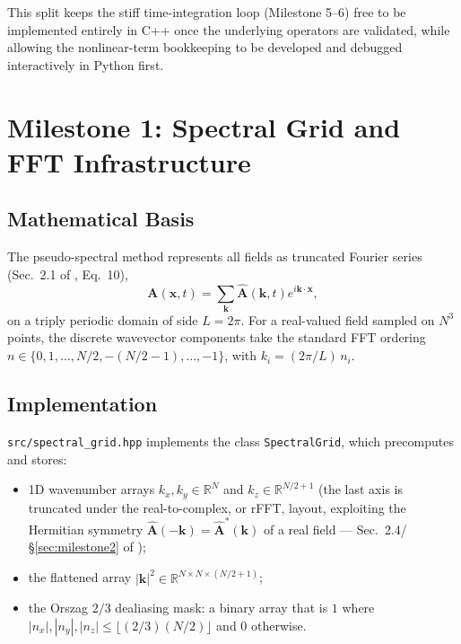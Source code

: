 \documentclass[11pt, a4paper]{article}
\begin{document}
This split keeps the stiff time-integration loop (Milestone 5--6) free to
be implemented entirely in C++ once the underlying operators are validated,
while allowing the nonlinear-term bookkeeping to be developed and debugged
interactively in Python first.

\section{Milestone 1: Spectral Grid and FFT Infrastructure}
\label{sec:milestone1}

\subsection{Mathematical Basis}

The pseudo-spectral method represents all fields as truncated Fourier
series (Sec.~2.1 of \citealp{foundation2026}, Eq.~10),
\begin{equation}
    \mathbf{A}(\mathbf{x}, t) = \sum_{\mathbf{k}} \hat{\mathbf{A}}(\mathbf{k}, t)
    e^{i \mathbf{k} \cdot \mathbf{x}},
\end{equation}
on a triply periodic domain of side $L = 2\pi$. For a real-valued field
sampled on $N^3$ points, the discrete wavevector components take the
standard FFT ordering $n \in \{0, 1, \dots, N/2, -(N/2-1), \dots, -1\}$,
with $k_i = (2\pi/L)\, n_i$.

\subsection{Implementation}

\texttt{src/spectral\_grid.hpp} implements the class \texttt{SpectralGrid},
which precomputes and stores:
\begin{itemize}
    \item 1D wavenumber arrays $k_x, k_y \in \mathbb{R}^N$ and
    $k_z \in \mathbb{R}^{N/2+1}$ (the last axis is truncated under the
    real-to-complex, or rFFT, layout, exploiting the Hermitian symmetry
    $\hat{\mathbf{A}}(-\mathbf{k}) = \hat{\mathbf{A}}^*(\mathbf{k})$ of a
    real field --- Sec.~2.4/\S\ref{sec:milestone2} of
    \citealp{foundation2026});
    \item the flattened array $|\mathbf{k}|^2 \in \mathbb{R}^{N \times N
    \times (N/2+1)}$;
    \item the Orszag $2/3$ dealiasing mask: a binary array that is $1$
    where $|n_x|, |n_y|, |n_z| \le \lfloor (2/3)(N/2) \rfloor$ and $0$
    otherwise.
\end{itemize}
\end{document}

